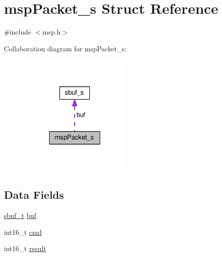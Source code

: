 \hypertarget{structmspPacket__s}{\section{msp\+Packet\+\_\+s Struct Reference}
\label{structmspPacket__s}
}


{\ttfamily \#include $<$msp.\+h$>$}



Collaboration diagram for msp\+Packet\+\_\+s\+:\nopagebreak
\begin{figure}[H]
\begin{center}
\leavevmode
\includegraphics[width=156pt]{structmspPacket__s__coll__graph}
\end{center}
\end{figure}
\subsection*{Data Fields}
\begin{DoxyCompactItemize}
\item 
\hyperlink{streambuf_8h_abd7643da00d55865c2216567de83ba6c}{sbuf\+\_\+t} \hyperlink{structmspPacket__s_ae835bf274f4b901c292ae43a65c45da3}{buf}
\item 
int16\+\_\+t \hyperlink{structmspPacket__s_a58b0239164891ae01fe7aaf34712bd6d}{cmd}
\item 
int16\+\_\+t \hyperlink{structmspPacket__s_aeef851f9aadd6d89a87e5d336be6f7e3}{result}
\end{DoxyCompactItemize}


